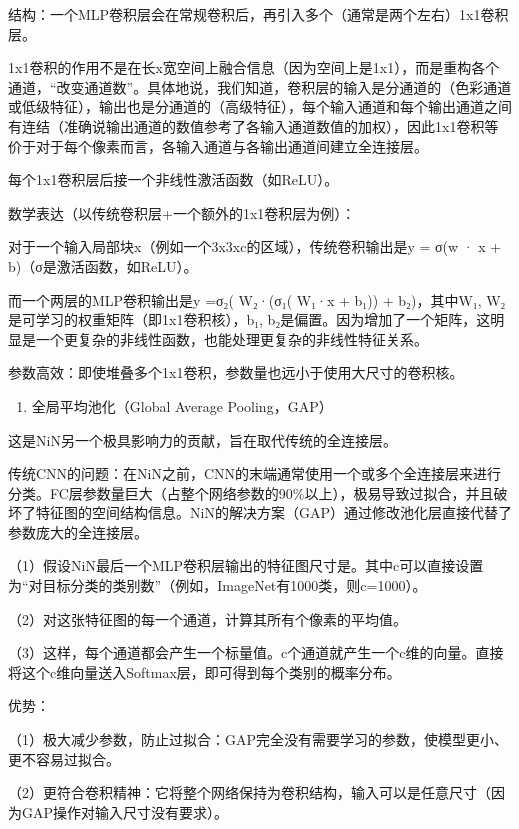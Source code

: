 结构：一个MLP卷积层会在常规卷积后，再引入多个（通常是两个左右）1x1卷积层。

1x1卷积的作用不是在长x宽空间上融合信息（因为空间上是1x1），而是重构各个通道，``改变通道数''。具体地说，我们知道，卷积层的输入是分通道的（色彩通道或低级特征），输出也是分通道的（高级特征），每个输入通道和每个输出通道之间有连结（准确说输出通道的数值参考了各输入通道数值的加权），因此1x1卷积等价于对于每个像素而言，各输入通道与各输出通道间建立全连接层。

每个1x1卷积层后接一个非线性激活函数（如ReLU）。

数学表达（以传统卷积层+一个额外的1x1卷积层为例）：

对于一个输入局部块x（例如一个3x3xc的区域），传统卷积输出是y = σ(w · x + b)（σ是激活函数，如ReLU）。

而一个两层的MLP卷积输出是y =σ₂( W₂·(σ₁( W₁·x + b₁)) + b₂)，其中W₁, W₂是可学习的权重矩阵（即1x1卷积核），b₁, b₂是偏置。因为增加了一个矩阵，这明显是一个更复杂的非线性函数，也能处理更复杂的非线性特征关系。

参数高效：即使堆叠多个1x1卷积，参数量也远小于使用大尺寸的卷积核。

\begin{enumerate}
\def\labelenumi{\arabic{enumi}.}
\setcounter{enumi}{1}
\tightlist
\item
  全局平均池化（Global Average Pooling，GAP）
\end{enumerate}

这是NiN另一个极具影响力的贡献，旨在取代传统的全连接层。

传统CNN的问题：在NiN之前，CNN的末端通常使用一个或多个全连接层来进行分类。FC层参数量巨大（占整个网络参数的90\%以上），极易导致过拟合，并且破坏了特征图的空间结构信息。NiN的解决方案（GAP）通过修改池化层直接代替了参数庞大的全连接层。

（1）假设NiN最后一个MLP卷积层输出的特征图尺寸是。其中c可以直接设置为``对目标分类的类别数''（例如，ImageNet有1000类，则c=1000）。

（2）对这张特征图的每一个通道，计算其所有个像素的平均值。

（3）这样，每个通道都会产生一个标量值。c个通道就产生一个c维的向量。直接将这个c维向量送入Softmax层，即可得到每个类别的概率分布。

优势：

（1）极大减少参数，防止过拟合：GAP完全没有需要学习的参数，使模型更小、更不容易过拟合。

（2）更符合卷积精神：它将整个网络保持为卷积结构，输入可以是任意尺寸（因为GAP操作对输入尺寸没有要求）。

